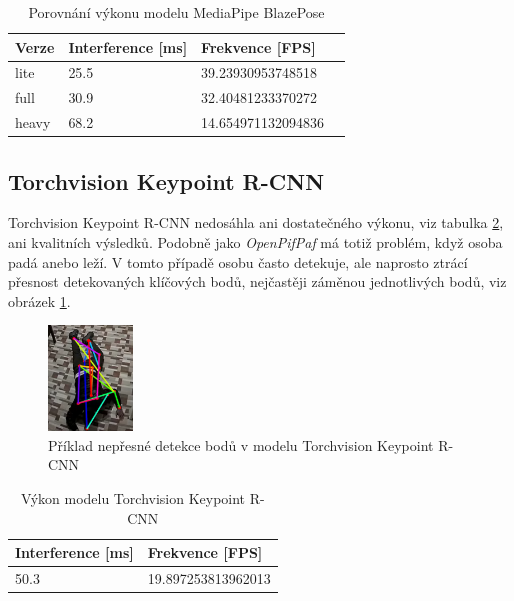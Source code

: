 \begin{table}[htbp]
    \centering
    \caption{Porovnání výkonu modelu MediaPipe BlazePose}
    \label{tab:mediapipe_performance}
    \begin{tabular}{|l|l|l|l|}
        \hline
        \textbf{Verze} & \textbf{Interference [ms]} & \textbf{Frekvence [FPS]} \\
        \hline
        lite           & 25.5                       & 39.23930953748518        \\ \hline
        full           & 30.9                       & 32.40481233370272        \\ \hline
        heavy          & 68.2                       & 14.654971132094836       \\ \hline
    \end{tabular}
\end{table}

\subsection{Torchvision Keypoint R-CNN}

Torchvision Keypoint R-CNN nedosáhla ani dostatečného výkonu, viz tabulka
\ref{tab:torchvision_performance}, ani kvalitních výsledků. Podobně jako
\textit{OpenPifPaf} má totiž problém, když osoba padá anebo leží. V tomto
případě osobu často detekuje, ale naprosto ztrácí přesnost detekovaných klíčových
bodů, nejčastěji záměnou jednotlivých bodů, viz obrázek \ref{fig:torchvision_bad}. 

\begin{figure}[]
    \centering
    \includegraphics[width=0.2\textwidth]{Figures/torchvision_bad.png}
    \caption{Příklad nepřesné detekce bodů v modelu Torchvision Keypoint R-CNN}
    \label{fig:torchvision_bad}
\end{figure}

\begin{table}[htbp]
    \centering
    \caption{Výkon modelu Torchvision Keypoint R-CNN}
    \label{tab:torchvision_performance}
    \begin{tabular}{|l|l|}
        \hline
        \textbf{Interference [ms]} & \textbf{Frekvence [FPS]} \\
        \hline
        50.3                       & 19.897253813962013       \\ \hline
    \end{tabular}
\end{table}


